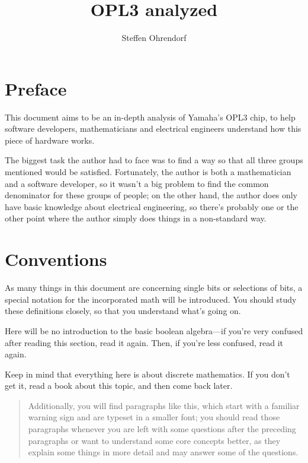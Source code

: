 \documentclass[english]{scrartcl}
\newenvironment{details}{
\par\nobreak\noindent%
\begin{quotation}%
  \footnotesize%
  \noindent\Radioactivity%
}{
\end{quotation}
}
\begin{document}
\title{OPL3 analyzed}
\author{Steffen Ohrendorf}
\maketitle


\section*{Preface}
This document aims to be an in-depth analysis of Yamaha's OPL3 chip, to help software developers, mathematicians and electrical engineers understand how this piece of hardware works.

The biggest task the author had to face was to find a way so that all three groups mentioned would be satisfied.
Fortunately, the author is both a mathematician and a software developer, so it wasn't a big problem to find the common denominator for these groups of people; on the other hand, the author does only have basic knowledge about electrical engineering, so there's probably one or the other point where the author simply does things in a non-standard way.

\tableofcontents



\section{Conventions}
As many things in this document are concerning single bits or selections of bits, a special notation for the incorporated math will be introduced.
You should study these definitions closely, so that you understand what's going on.

Here will be no introduction to the basic boolean algebra---if you're very confused after reading this section, read it again.
Then, if you're less confused, read it again.

Keep in mind that everything here is about discrete mathematics.
If you don't get it, read a book about this topic, and then come back later.

\begin{details}
Additionally, you will find paragraphs like this, which start with a familiar warning sign and are typeset in a smaller font; you should read those paragraphs whenever you are left with some questions after the preceding paragraphs or want to understand some core concepts better, as they explain some things in more detail and may answer some of the questions.
\end{details}
\end{document}
